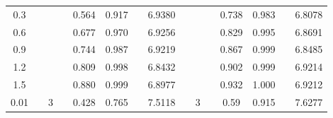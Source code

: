 \documentclass[12pt]{article}
\begin{document}
\begin{table}[!ht]
\begin{threeparttable}
\begin{tabular}{clllcllclllcclc}
0.3                                               &  &                               &  & 0.564                        & 0.917                                           &  & 6.9380                                                                     &  &                               &  & 0.738                                  & 0.983                                 &  & 6.8078                                                                    \\
0.6                                               &  &                               &  & 0.677                        & 0.970                                            &  & 6.9256                                                                    &  &                               &  & 0.829                                  & 0.995                                 &  & 6.8691                                                                    \\
0.9                                               &  &                               &  & 0.744                        & 0.987                                           &  & 6.9219                                                                    &  &                               &  & 0.867                                  & 0.999                                 &  & 6.8485                                                                    \\
1.2                                               &  &                               &  & 0.809                        & 0.998                                           &  & 6.8432                                                                    &  &                               &  & 0.902                                  & 0.999                                 &  & 6.9214                                                                    \\
1.5                                               &  &                               &  & 0.880                         & 0.999                                           &  & 6.8977                                                                    &  &                               &  & 0.932                                  & 1.000                                   &  & 6.9212                                                                    \\ \midrule
0.01                                              &  & 3                             &  & 0.428                        & 0.765                                           &  & 7.5118                                                                    &  & 3                             &  & 0.59                                   & 0.915                                 &  & 7.6277                                                                    \\

\end{tabular}
\end{threeparttable}
\end{table}
\end{document}
